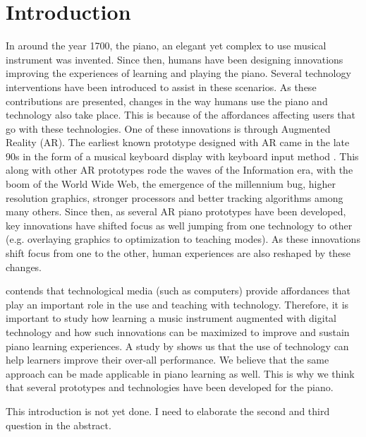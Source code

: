 \documentclass[sigchi, review]{acmart}
\begin{document}
\section{Introduction}
In around the year 1700, the piano, an elegant yet complex to use musical instrument was invented. Since then, humans have been designing innovations improving the experiences of learning and playing the piano. Several technology interventions have been introduced to assist in these scenarios. As these contributions are presented, changes in the way humans use the piano and technology also take place. This is because of the affordances affecting users that go with these technologies. One of these innovations is through Augmented Reality (AR). The earliest known prototype designed with AR came in the late 90s in the form of a musical keyboard display with keyboard input method \cite{breitweiser1996musical}. This along with other AR prototypes rode the waves of the Information era, with the boom of the World Wide Web, the emergence of the millennium bug, higher resolution graphics, stronger processors and better tracking algorithms among many others. Since then, as several AR piano prototypes have been developed, key innovations have shifted focus as well jumping from one technology to other (e.g. overlaying graphics to optimization to teaching modes). As these innovations shift focus from one to the other, human experiences are also reshaped by these changes. 

\citet{dede1996evolution} contends that technological media (such as computers) provide affordances that play an important role in the use and teaching with technology. Therefore, it is important to study how learning a music instrument augmented with digital technology and how such innovations can be maximized to improve and sustain piano learning experiences. A study by \citet{tamim2011forty} shows us that the use of technology can help learners improve their over-all performance. We believe that the same approach can be made applicable in piano learning as well. This is why we think that several prototypes and technologies have been developed for the piano. 

This introduction is not yet done. I need to elaborate the second and third question in the abstract. 
\end{document}
